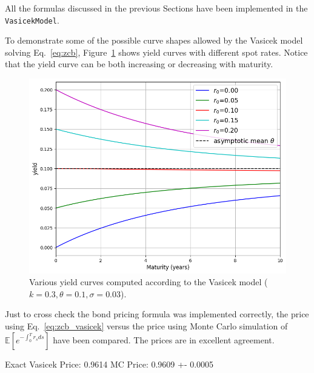 All the formulas discussed in the previous Sections have been implemented in the \texttt{VasicekModel}.

To demonstrate some of the possible curve shapes allowed by the Vasicek model solving Eq.~\ref{eq:zcb}, Figure~\ref{fig:yield_vasicek} shows yield curves with different spot rates. Notice that the yield curve can be both increasing or decreasing with maturity.

\begin{figure}[htb]
    \centering
    \includegraphics[width=0.7\linewidth]{figures/vasicek_yields}
    \caption{Various yield curves computed according to the Vasicek model ($k=0.3, \theta=0.1, \sigma=0.03$).}
    \label{fig:yield_vasicek}
\end{figure}

Just to cross check the bond pricing formula was implemented correctly, the price using Eq.~\ref{eq:zcb_vasicek} versus the price using Monte Carlo simulation of $\mathbb{E}\left[e^{-\int_0^T r_s ds}\right]$ have been compared. The prices are in excellent agreement.

\begin{ioutput}
Exact Vasicek Price: 0.9614
MC Price: 0.9609 +- 0.0005
\end{ioutput}

